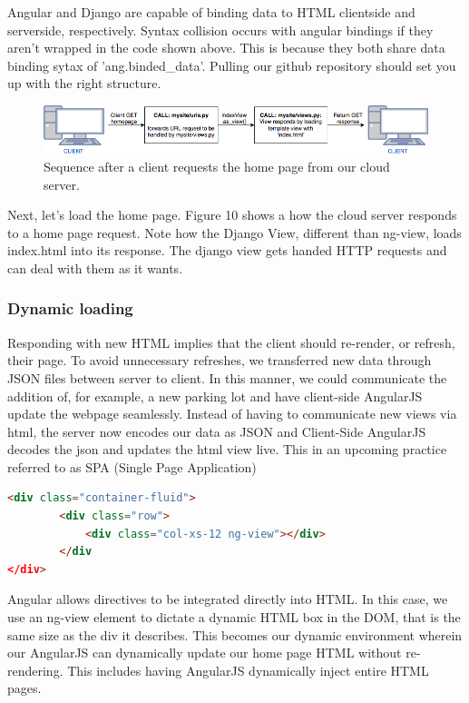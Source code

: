 Angular and Django are capable of binding data to HTML clientside and serverside, respectively.
Syntax collision occurs with angular bindings if they aren't wrapped in the code shown above.
This is because they both share data binding sytax of '{{ang.binded\_data}}'.
Pulling our github repository should set you up with the right structure.

\vspace{0.5cm}
\begin{figure}
\includegraphics[width=1\textwidth]{pictures/Client_getIndex.png}
\caption{Sequence after a client requests the home page from our cloud server.}
\end{figure}

Next, let's load the home page.
Figure 10 shows a how the cloud server responds to a home page request.
Note how the Django View, different than ng-view, loads index.html into its response.
The django view gets handed HTTP requests and can deal with them as it wants.


\newpage
\subsubsection{Dynamic loading}
Responding with new HTML implies that the client should re-render, or refresh, their page.
To avoid unnecessary refreshes, we transferred new data through JSON files between server to client.
In this manner, we could communicate the addition of, for example, a new parking lot and have client-side AngularJS update the webpage seamlessly.
Instead of having to communicate new views via html, the server now encodes our data as JSON and Client-Side AngularJS decodes the json and updates the html view live.
This in an upcoming practice referred to as SPA (Single Page Application)

\vspace{0.5cm}
\begin{lstlisting}[language=html]
<div class="container-fluid">
		<div class="row">
			<div class="col-xs-12 ng-view"></div>
		</div
</div>
\end{lstlisting}
\vspace{0.5cm}

Angular allows directives to be integrated directly into HTML.
In this case, we use an ng-view element to dictate a dynamic HTML box in the DOM, that is the same size as the div it describes.
This becomes our dynamic environment wherein our AngularJS can dynamically update our home page HTML without re-rendering.
This includes having AngularJS dynamically inject entire HTML pages.

